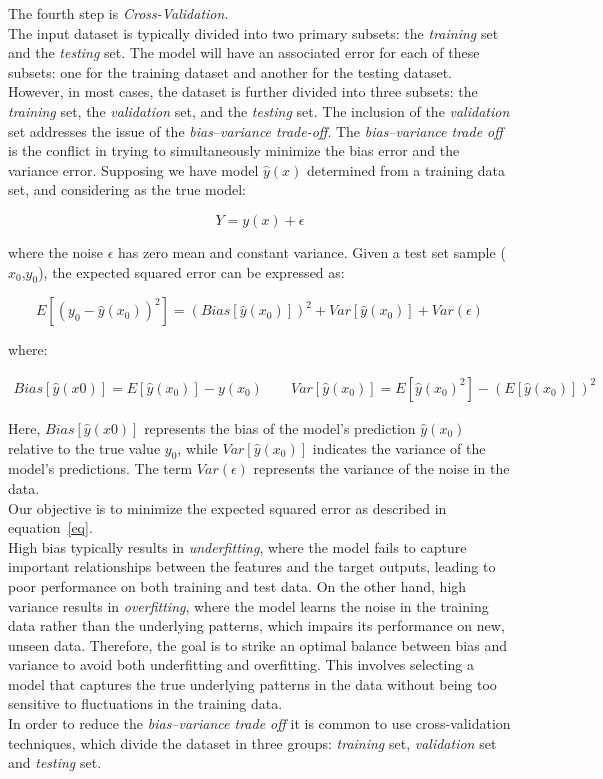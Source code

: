 The fourth step is \textit{Cross-Validation}.\\
The input dataset is typically divided into two primary subsets: the \textit{training} set and the \textit{testing} set. 
The model will have an associated error for each of these subsets: one for the training dataset and another for the testing dataset.
However, in most cases, the dataset is further divided into three subsets: the \textit{training} set, the \textit{validation} set, and 
the \textit{testing} set. The inclusion of the \textit{validation} set addresses the issue of the \textit{bias–variance trade-off}.
The \textit{bias–variance trade off} is the conflict in trying to simultaneously minimize the bias error and the variance error.
Supposing we have model $\hat{y}(x)$ determined from a training data set, and considering as the true model:

\begin{equation}
    Y = y(x) + \epsilon
\end{equation}

where the noise $\epsilon$ has zero mean and constant variance.
Given a test set sample ($x_0$,$y_0$), the expected squared error can be expressed as:

\begin{equation}
    E[(y_0 - \hat{y}(x_0))^2] = (Bias[\hat{y}(x_0)])^2 + Var[\hat{y}(x_0)] + Var(\epsilon) 
\label{eq:variance-bias}
\end{equation}

where:

\begin{align}
Bias[\hat{y}(x0)] = E[\hat{y}(x_0)] - y(x_0)
\qquad
Var[\hat{y}(x_0)] = E[\hat{y}(x_0)^2] - (E[\hat{y}(x_0)])^2
\label{eq:variance-bias-errors}
\end{align}

Here, $Bias[\hat{y}(x0)]$ represents the bias of the model's prediction $\hat{y}(x_0)$ relative to the true value $y_0$, while 
$Var[\hat{y}(x_0)]$ indicates the variance of the model's predictions. The term $Var(\epsilon)$ represents the variance of the noise in the data.\\
Our objective is to minimize the expected squared error as described in equation~\ref{eq}.\\
High bias typically results in \textit{underfitting}, where the model fails to capture important relationships between the 
features and the target outputs, leading to poor performance on both training and test data. On the other hand, high 
variance results in \textit{overfitting}, where the model learns the noise in the training data rather than 
the underlying patterns, which impairs its performance on new, unseen data.
Therefore, the goal is to strike an optimal balance between bias and variance to avoid both underfitting and overfitting. 
This involves selecting a model that captures the true underlying patterns in the data without being too sensitive to fluctuations 
in the training data.\\
In order to reduce the \textit{bias–variance trade off} it is common to use cross-validation techniques, 
which divide the dataset in three groups: \textit{training} set, \textit{validation} set and \textit{testing} set.

